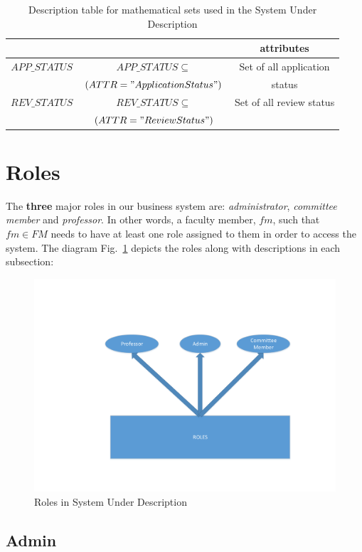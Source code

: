 \documentclass[fontsize=12pt,paper=letter,twoside]{scrartcl}
\begin{document}
\begin{table}[!htb]
\begin{tabular}{| c | c | c |}
	& & attributes\\ \hline
	$APP\_STATUS$ & $APP\_STATUS \subseteq$  & Set of all application \\
	& $(ATTR = "Application Status")$ & status\\ \hline
	$REV\_STATUS$ & $REV\_STATUS \subseteq$  & Set of all review status\\ 
	& $(ATTR = "Review Status")$ & \\ \hline
\end{tabular}
\caption {Description table for mathematical sets used in the System Under Description}
\label{tbl:sets1}
\end{table}

\newpage
\section{Roles} \label{roles}

The \textbf{three} major roles in our business system are: \emph{administrator}, \emph{committee member} and \emph{professor}. In other words, a faculty member, $fm$, such that $fm \in FM$ needs to have at least one role assigned to them in order to access the system. The diagram Fig.~\ref{fig:all_roles_sud} depicts the roles along with descriptions in each subsection:

\begin{figure}[!htb]
\begin{center}
\includegraphics[width=.8\textwidth]{images/all_roles.pdf}
\end{center}
\caption{Roles in System Under Description}
\label{fig:all_roles_sud}
\end{figure}

\subsection{Admin}
\end{document}
